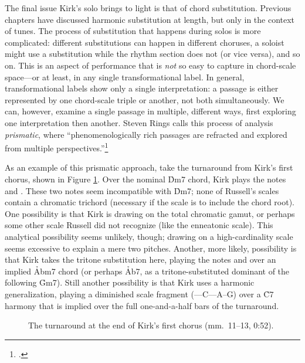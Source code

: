 The final issue Kirk's solo brings to light is that of chord substitution.
Previous chapters have discussed harmonic substitution at length, but only in
the context of tunes. The process of substitution that happens during solos is
more complicated: different substitutions can happen in different choruses, a
soloist might use a substitution while the rhythm section does not (or vice
versa), and so on. This is an aspect of performance that is \emph{not} so easy
to capture in chord-scale space---or at least, in any single transformational
label. In general, transformational labels show only a single
interpretation: a passage is either represented by one chord-scale triple or
another, not both simultaneously. We can, however, examine a single passage in
multiple, different ways, first exploring one interpretation then another.
Steven Rings calls this process of analysis \emph{prismatic}, where
``phenomenologically rich passages are refracted and explored from multiple
perspectives.''\footcite[38]{rings:2011}

As an example of this prismatic approach, take the turnaround from Kirk's
first chorus, shown in Figure \ref{csa:first-chorus-turnaround}. Over the
nominal \h{Dm7} chord, Kirk plays the notes \Eflat and \Dflat. These two notes
seem incompatible with \h{Dm7}; none of Russell's scales contain a chromatic
trichord (necessary if the scale is to include the chord root). One
possibility is that Kirk is drawing on the total chromatic gamut, or perhaps
some other scale Russell did not recognize (like the enneatonic scale). This
analytical possibility seems unlikely, though; drawing on a high-cardinality
scale seems excessive to explain a mere two pitches. Another, more likely,
possibility is that Kirk takes the tritone substitution here, playing the
notes \Eflat and \Dflat over an implied \h{Abm7} chord (or perhaps \h{Ab7}, as a
tritone-substituted dominant of the following \h{Gm7}). Still another
possibility is that Kirk uses a harmonic generalization, playing a diminished
scale fragment (\Eflat--\Dflat--C--\Bflat--A--G) over a \h{C7} harmony that is
implied over the full one-and-a-half bars of the turnaround.

\begin{figure}[tbp]
  \caption[The turnaround at the end of Kirk's first chorus.]{The turnaround
    at the end of Kirk's first chorus (mm.~11--13, 0:52).}
  \label{csa:first-chorus-turnaround}
\end{figure}

